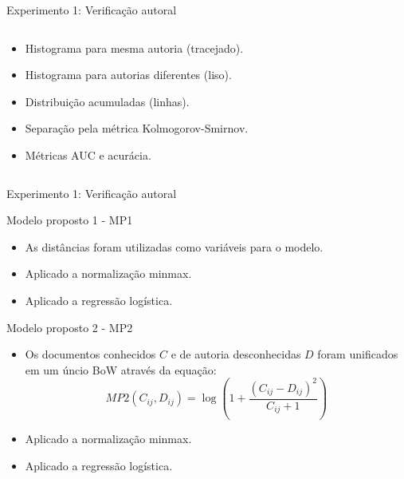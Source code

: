 \begin{frame}{Experimento 1: Verificação autoral}
\begin{columns}
\begin{column}{0.37\textwidth}
\begin{itemize}
	\item Histograma para mesma autoria (tracejado).
	\item Histograma para autorias diferentes (liso).
	\item Distribuição acumuladas (linhas).
	\item Separação pela métrica Kolmogorov-Smirnov.
	\item Métricas AUC e acurácia.
\end{itemize}
\end{column}
\end{columns}


\end{frame}
\begin{frame}{Experimento 1: Verificação autoral}
	\begin{block}{Modelo proposto 1 - MP1}
	\begin{itemize}
		\item As distâncias foram utilizadas como variáveis para o modelo.
		\item Aplicado a normalização minmax.
		\item Aplicado a regressão logística.
		\end{itemize}
	\end{block}
	\begin{block}{Modelo proposto 2 - MP2}
		\begin{itemize}
		\item Os documentos conhecidos $C$ e de autoria desconhecidas $D$ foram unificados em um úncio BoW através da equação:
		\begin{equation}
		MP2\left ( C_{ij}, D_{ij} \right ) = \log\left ( 1 + \frac{\left ( C_{ij}-D_{ij} \right )^2}{C_{ij}+1} \right )
		\label{eq:verificacao.mp2}
		\end{equation}
		\item Aplicado a normalização minmax.
		\item Aplicado a regressão logística.
		\end{itemize}		
	\end{block}	
\end{frame}

